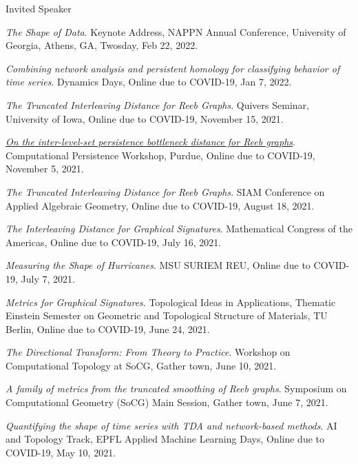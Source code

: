 \documentclass{resume} %
\begin{document}
\begin{rSection}{Invited Speaker}
\begin{etaremune}
\item\emph{The Shape of Data}. Keynote Address, NAPPN Annual Conference, University of Georgia, Athens, GA, Twosday, Feb 22, 2022. 

\item\emph{Combining network analysis and persistent homology for classifying behavior of time series}. Dynamics Days, Online due to COVID-19, Jan 7, 2022. 

\item\emph{The Truncated Interleaving Distance for Reeb Graphs}. Quivers Seminar, University of Iowa, Online due to COVID-19, November 15, 2021. 

\item\emph{\href{https://drive.google.com/file/d/1lnZ_g1aQBkX4W6F9SRovgQ8Bzih1Is97/view?usp=sharing}{On the inter-level-set persistence bottleneck distance for Reeb graphs}}. Computational Persistence Workshop, Purdue, Online due to COVID-19, November 5, 2021. 

\item\emph{The Truncated Interleaving Distance for Reeb Graphs}. SIAM Conference on Applied Algebraic Geometry, Online due to COVID-19, August 18, 2021. 

\item\emph{The Interleaving Distance for Graphical Signatures}. Mathematical Congress of the Americas, Online due to COVID-19, July 16, 2021. 

\item\emph{Measuring the Shape of Hurricanes}. MSU SURIEM REU, Online due to COVID-19, July 7, 2021. 

\item\emph{Metrics for Graphical Signatures}. Topological Ideas in Applications, Thematic Einstein Semester on Geometric and Topological Structure of Materials, TU Berlin, Online due to COVID-19, June 24, 2021. 

\item\emph{The Directional Transform: From Theory to Practice}. Workshop on Computational Topology at SoCG, Gather town, June 10, 2021. 

\item\emph{A family of metrics from the truncated smoothing of Reeb graphs}. Symposium on Computational Geometry (SoCG) Main Session, Gather town, June 7, 2021. 

\item\emph{Quantifying the shape of time series with TDA and network-based methods}. AI and Topology Track, EPFL Applied Machine Learning Days, Online due to COVID-19, May 10, 2021. 


\end{etaremune}
\end{rSection}
\end{document}
